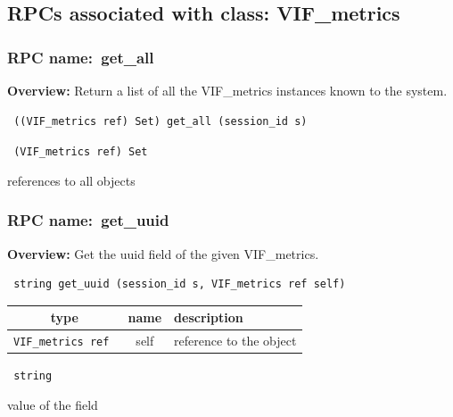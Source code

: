 \subsection{RPCs associated with class: VIF\_metrics}
\subsubsection{RPC name:~get\_all}

{\bf Overview:} 
Return a list of all the VIF\_metrics instances known to the system.

\begin{verbatim} ((VIF_metrics ref) Set) get_all (session_id s)\end{verbatim}


\vspace{0.3cm}

{\tt 
(VIF\_metrics ref) Set
}


references to all objects
\vspace{0.3cm}
\vspace{0.3cm}
\vspace{0.3cm}
\subsubsection{RPC name:~get\_uuid}

{\bf Overview:} 
Get the uuid field of the given VIF\_metrics.

\begin{verbatim} string get_uuid (session_id s, VIF_metrics ref self)\end{verbatim}



 
\vspace{0.3cm}
\begin{tabular}{|c|c|p{7cm}|}
 \hline
{\bf type} & {\bf name} & {\bf description} \\ \hline
{\tt VIF\_metrics ref } & self & reference to the object \\ \hline 

\end{tabular}

\vspace{0.3cm}

{\tt 
string
}


value of the field
\vspace{0.3cm}
\vspace{0.3cm}
\vspace{0.3cm}
